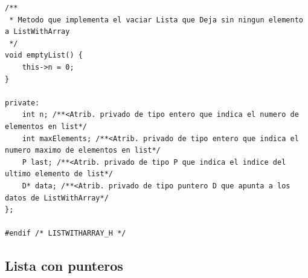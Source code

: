 \documentclass[11pt]{article}
\begin{document}
\begin{lstlisting}
/**
 * Metodo que implementa el vaciar Lista que Deja sin ningun elemento a ListWithArray
 */
void emptyList() {
    this->n = 0;
}

private:
    int n; /**<Atrib. privado de tipo entero que indica el numero de elementos en list*/
    int maxElements; /**<Atrib. privado de tipo entero que indica el numero maximo de elementos en list*/
    P last; /**<Atrib. privado de tipo P que indica el indice del ultimo elemento de list*/
    D* data; /**<Atrib. privado de tipo puntero D que apunta a los datos de ListWithArray*/
};

#endif /* LISTWITHARRAY_H */

\end{lstlisting}

\subsection{Lista con punteros}
\end{document}
